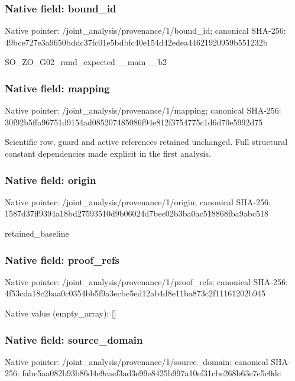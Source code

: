 \documentclass[10pt,a4paper]{article}
\begin{document}
\subsubsection{Native field: bound\_\allowbreak{}id}
Native pointer: /joint\_\allowbreak{}analysis/provenance/1/bound\_\allowbreak{}id; canonical SHA-256: 49bce727e3a9650bddc37fc01e5bdbfc40e154d42edea44621920959b551232b

\begingroup\raggedright\sloppy SO\_\allowbreak{}ZO\_\allowbreak{}G02\_\allowbreak{}rand\_\allowbreak{}expected\_\allowbreak{}\_\allowbreak{}main\_\allowbreak{}\_\allowbreak{}b2\par\endgroup

\subsubsection{Native field: mapping}
Native pointer: /joint\_\allowbreak{}analysis/provenance/1/mapping; canonical SHA-256: 30f92b5ffa96751d9154ad085207485086f94e812f3754775c1d6d70e5992d75

\begingroup\raggedright\sloppy Scientific row,\allowbreak{} guard and active references retained unchanged. Full structural constant dependencies made explicit in the first analysis.\par\endgroup

\subsubsection{Native field: origin}
Native pointer: /joint\_\allowbreak{}analysis/provenance/1/origin; canonical SHA-256: 1587d37ff9394a18bd27593510d9b06024d7bec02b3ba0ac518868fba9abc518

\begingroup\raggedright\sloppy retained\_\allowbreak{}baseline\par\endgroup

\subsubsection{Native field: proof\_\allowbreak{}refs}
Native pointer: /joint\_\allowbreak{}analysis/provenance/1/proof\_\allowbreak{}refs; canonical SHA-256: 4f53cda18c2baa0c0354bb5f9a3ecbe5ed12ab4d8e11ba873c2f11161202b945

Native value (empty\_\allowbreak{}array): []

\subsubsection{Native field: source\_\allowbreak{}domain}
Native pointer: /joint\_\allowbreak{}analysis/provenance/1/source\_\allowbreak{}domain; canonical SHA-256: fabe5aa082b93b86d4e9eaef3ad3e99e8425b997a10ef31cbe268b63e7e5c0dc
\end{document}
